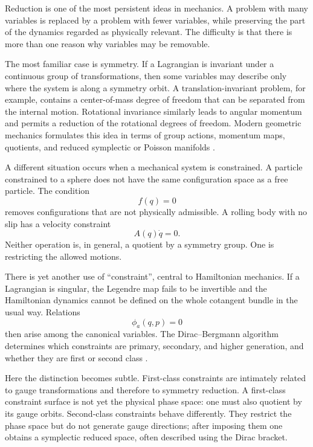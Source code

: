 \documentclass[11pt,a4paper]{article}
\theoremstyle{definition}
\begin{document}
Reduction is one of the most persistent ideas in mechanics.  A problem with
many variables is replaced by a problem with fewer variables, while preserving
the part of the dynamics regarded as physically relevant.  The difficulty is
that there is more than one reason why variables may be removable.

The most familiar case is symmetry.  If a Lagrangian is invariant under a
continuous group of transformations, then some variables may describe only
where the system is along a symmetry orbit.  A translation-invariant problem,
for example, contains a center-of-mass degree of freedom that can be separated
from the internal motion.  Rotational invariance similarly leads to angular
momentum and permits a reduction of the rotational degrees of freedom.
Modern geometric mechanics formulates this idea in terms of group actions,
momentum maps, quotients, and reduced symplectic or Poisson manifolds
\cite{MarsdenWeinstein1974,MarsdenRatiu2007,CendraMarsdenRatiu2001}.

A different situation occurs when a mechanical system is constrained.  A
particle constrained to a sphere does not have the same configuration space
as a free particle.  The condition
\[
        f(q)=0
\]
removes configurations that are not physically admissible.  A rolling body
with no slip has a velocity constraint
\[
        A(q)\dot q=0.
\]
Neither operation is, in general, a quotient by a symmetry group.  One is
restricting the allowed motions.

There is yet another use of ``constraint'', central to Hamiltonian mechanics.
If a Lagrangian is singular, the Legendre map fails to be invertible and the
Hamiltonian dynamics cannot be defined on the whole cotangent bundle in the
usual way.  Relations
\[
        \phi_a(q,p)=0
\]
then arise among the canonical variables.  The Dirac--Bergmann algorithm
determines which constraints are primary, secondary, and higher generation,
and whether they are first or second class
\cite{Dirac1950,Dirac1964,GotayNesterHinds1978,HenneauxTeitelboim1992}.

Here the distinction becomes subtle.  First-class constraints are intimately
related to gauge transformations and therefore to symmetry reduction.  A
first-class constraint surface is not yet the physical phase space: one must
also quotient by its gauge orbits.  Second-class constraints behave
differently.  They restrict the phase space but do not generate gauge
directions; after imposing them one obtains a symplectic reduced space, often
described using the Dirac bracket.
\end{document}
